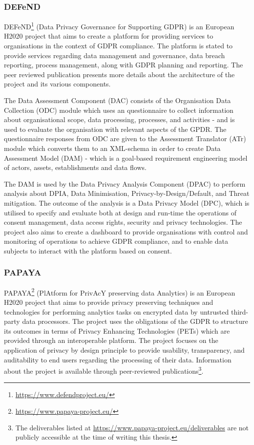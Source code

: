 \subsubsection{DEFeND}
DEFeND\footnote{\url{https://www.defendproject.eu/}} (Data Privacy Governance for Supporting GDPR) is an European H2020 project that aims to create a platform for providing services to organisations in the context of GDPR compliance. The platform is stated to provide services regarding data management and governance, data breach reporting, process management, along with GDPR planning and reporting. The peer reviewed publication \cite{piras_defend_2019} presents more details about the architecture of the project and its various components.

The Data Assessment Component (DAC) consists of the Organisation Data Collection (ODC) module which uses an questionnaire to collect information about organisational scope, data processing, processes, and activities - and is used to evaluate the organisation with relevant aspects of the GPDR. The questionnaire responses from ODC are given to the Assessment Translator (ATr) module which converts them to an XML-schema in order to create Data Assessment Model (DAM) - which is a goal-based requirement engineering model of actors, assets, establishments and data flows.

The DAM is used by the Data Privacy Analysis Component (DPAC) to perform analysis about DPIA, Data Minimisation, Privacy-by-Design/Default, and Threat mitigation. The outcome of the analysis is a Data Privacy Model (DPC), which is utilised to specify and evaluate both at design and run-time the operations of consent management, data access rights, security and privacy technologies. The project also aims to create a dashboard to provide organisations with control and monitoring of operations to achieve GDPR compliance, and to enable data subjects to interact with the platform based on consent.

\subsubsection{PAPAYA}
PAPAYA\footnote{\url{https://www.papaya-project.eu/}} (PlAtform for PrivAcY preserving data Analytics) is an European H2020 project that aims to provide privacy preserving techniques and technologies for performing analytics tasks on encrypted data by untrusted third-party data processors. The project uses the obligations of the GDPR to structure its outcomes in terms of Privacy Enhancing Technologies (PETs) which are provided through an interoperable platform. The project focuses on the application of privacy by design principle to provide usability, transparency, and auditability to end users regarding the processing of their data. Information about the project is available through peer-reviewed publications\footnote{The deliverables listed at \url{https://www.papaya-project.eu/deliverables} are not publicly accessible at the time of writing this thesis.}.

